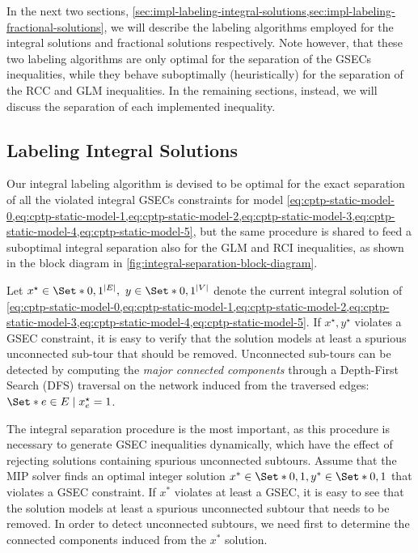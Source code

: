 \medskip

In the next two sections, \cref{sec:impl-labeling-integral-solutions,sec:impl-labeling-fractional-solutions},
we will describe the labeling algorithms employed for the integral solutions
and fractional solutions respectively.
Note however, that these two labeling algorithms
are only optimal for the separation of the GSECs inequalities,
while they behave suboptimally (heuristically) for the separation of the RCC and GLM inequalities.
In the remaining sections, instead,
we will discuss the separation of each implemented inequality.

\subsection{Labeling Integral Solutions}
\label{sec:impl-labeling-integral-solutions}

Our integral labeling algorithm
is devised to be optimal for the exact separation of all the violated integral GSECs constraints
for model \cref{eq:cptp-static-model-0,eq:cptp-static-model-1,eq:cptp-static-model-2,eq:cptp-static-model-3,eq:cptp-static-model-4,eq:cptp-static-model-5},
but the same procedure is shared
to feed a suboptimal integral separation also for the GLM and RCI inequalities,
as shown in the block diagram in \cref{fig:integral-separation-block-diagram}.

Let $x^\star \in \Set*{0, 1}^{|E|},\ y \in \Set*{0, 1}^{|V|}$ denote the
current integral solution of
\cref{eq:cptp-static-model-0,eq:cptp-static-model-1,eq:cptp-static-model-2,eq:cptp-static-model-3,eq:cptp-static-model-4,eq:cptp-static-model-5}.
If $x^\star, y^\star$ violates a GSEC constraint,
it is easy to verify that the solution models at least a spurious unconnected sub-tour that should be removed.
Unconnected sub-tours can be detected
by computing the \textit{major connected components}
through a Depth-First Search (DFS) traversal
on the network induced from the traversed edges:  $\Set*{e \in E \mid x^\star_e = 1}$.


The integral separation procedure is the most important, as this procedure is necessary to generate GSEC inequalities dynamically, which have the effect of rejecting solutions containing spurious unconnected subtours.
Assume that the MIP solver finds an optimal integer solution $x^* \in \Set*{0, 1}, y^* \in \Set*{0, 1}$ that violates a GSEC constraint.
If $x^*$ violates at least a GSEC, it is easy to see that the solution models at least a spurious unconnected subtour that needs to be removed.
In order to detect unconnected subtours, we need first to determine the connected components induced from the $x^*$ solution.

